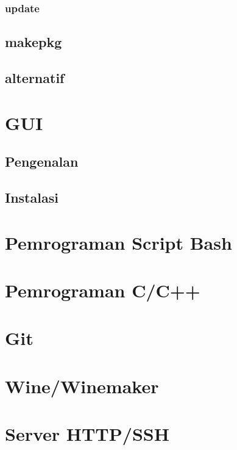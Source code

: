 \documentclass[12pt,]{article}
\begin{document}
	\subsubsection{update}
	\subsection{makepkg}
	\subsection{alternatif}
	
	\section{GUI}
	\subsection{Pengenalan}
	\subsection{Instalasi}
	
	\section{Pemrograman Script Bash}
	
	\section{Pemrograman C/C++}
	
	\section{Git}
	
	\section{Wine/Winemaker}
	
	\section{Server HTTP/SSH}
\end{document}
